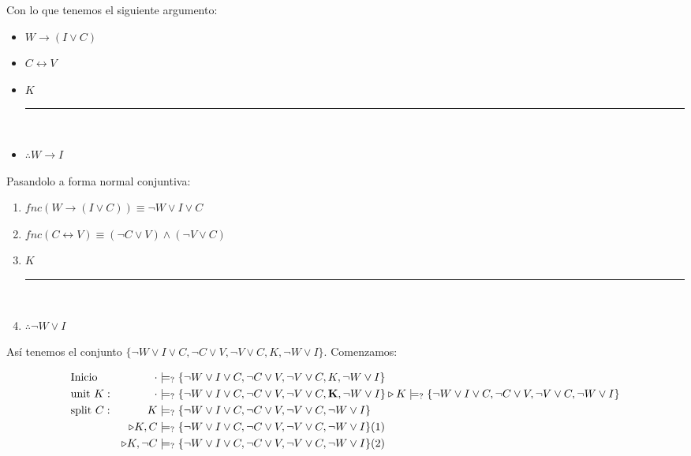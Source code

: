 \documentclass[8pt, letterpaper]{article}
\begin{document}
\begin{enumerate}
  \begin{multicols}{2}
    Con lo que tenemos el siguiente argumento:
    \begin{itemize}
    \item $W \rightarrow (I \lor C)$
    \item $C \leftrightarrow V$
    \item $K$\\
      \rule{.3\textwidth}{0.2mm}\\
  \item $\therefore W \rightarrow I$
    \end{itemize}
    Pasandolo a forma normal conjuntiva:
    \begin{enumerate}
    \item $fnc(W \rightarrow (I \lor C)) \equiv \neg W \lor I \lor C$
    \item $fnc(C \leftrightarrow V) \equiv (\neg C\lor V)\land(\neg V\lor C)$
    \item $K$ \\
      \rule{.3\textwidth}{0.2mm}\\
    \item $\therefore \neg W \lor I$
    \end{enumerate}
  \end{multicols}
  Así tenemos el conjunto $\{\neg W \lor I \lor C, \neg C\lor V, \neg V\lor C, K, \neg W\lor I\}$. Comenzamos:

  \begin{align*}
    &\text{Inicio} & \cdot &\models_? \{\neg W \lor I \lor C, \neg C\lor V, \neg V\lor C, K, \neg W\lor I\}\\
    &\text{unit } K : & \cdot &\models_? \{\neg W \lor I \lor C, \neg C\lor V, \neg V\lor C, {\bf K}, \neg W\lor I\}
    \triangleright K \models_? \{\neg W \lor I \lor C, \neg C\lor V, \neg V\lor C,\neg W\lor I\} \\
    &\text{split } C: & K &\models_? \{\neg W \lor I \lor C, \neg C\lor V, \neg V\lor C,\neg W\lor I\}\\
    & & \triangleright K, C &\models_? \{\neg W \lor I \lor C, \neg C\lor V, \neg V\lor C,\neg W\lor I\} (1)\\
    & & \triangleright K, \neg C &\models_? \{\neg W \lor I \lor C, \neg C\lor V, \neg V\lor C,\neg W\lor I\} (2)
  \end{align*}
  

\end{enumerate}
\end{document}

